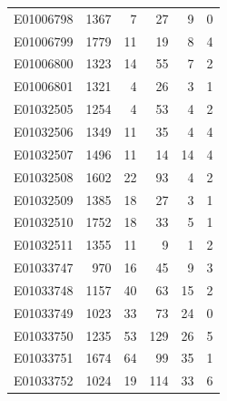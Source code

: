 \documentclass[
  letterpaper,
  DIV=11,
  numbers=noendperiod]{scrreprt}
\begin{document}
\begin{tabular}{lrrrrr}
E01006798     &    1367 &       7 &                    27 &                               9 &                       0 \\
E01006799     &    1779 &      11 &                    19 &                               8 &                       4 \\
E01006800     &    1323 &      14 &                    55 &                               7 &                       2 \\
E01006801     &    1321 &       4 &                    26 &                               3 &                       1 \\
E01032505     &    1254 &       4 &                    53 &                               4 &                       2 \\
E01032506     &    1349 &      11 &                    35 &                               4 &                       4 \\
E01032507     &    1496 &      11 &                    14 &                              14 &                       4 \\
E01032508     &    1602 &      22 &                    93 &                               4 &                       2 \\
E01032509     &    1385 &      18 &                    27 &                               3 &                       1 \\
E01032510     &    1752 &      18 &                    33 &                               5 &                       1 \\
E01032511     &    1355 &      11 &                     9 &                               1 &                       2 \\
E01033747     &     970 &      16 &                    45 &                               9 &                       3 \\
E01033748     &    1157 &      40 &                    63 &                              15 &                       2 \\
E01033749     &    1023 &      33 &                    73 &                              24 &                       0 \\
E01033750     &    1235 &      53 &                   129 &                              26 &                       5 \\
E01033751     &    1674 &      64 &                    99 &                              35 &                       1 \\
E01033752     &    1024 &      19 &                   114 &                              33 &                       6 \\

\end{tabular}
\end{document}

